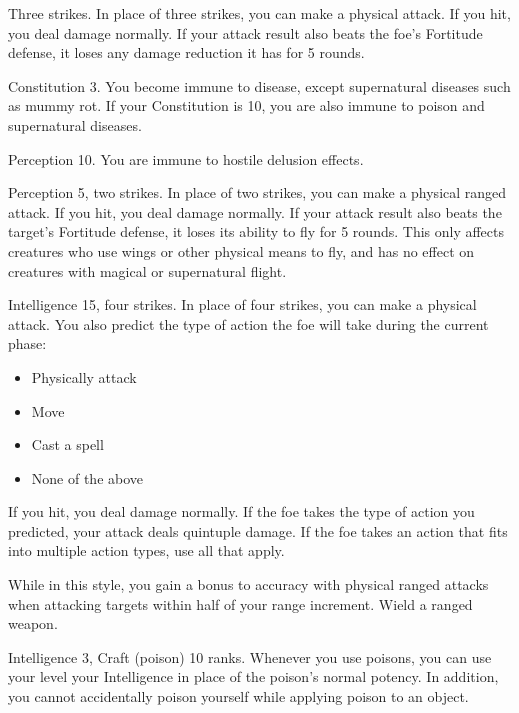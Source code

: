 \featpre Three strikes.
\featben In place of three strikes, you can make a physical attack.
If you hit, you deal damage normally.
If your attack result also beats the foe's Fortitude defense, it loses any damage reduction it has for 5 rounds.

\featpre Constitution 3.
\featben You become immune to disease, except supernatural diseases such as mummy rot.
If your Constitution is 10, you are also immune to poison and supernatural diseases.

\featpre Perception 10.
\featben You are immune to hostile delusion effects.

\featpre Perception 5, two strikes.
\featben In place of two strikes, you can make a physical ranged attack.
If you hit, you deal damage normally.
If your attack result also beats the target's Fortitude defense, it loses its ability to fly for 5 rounds.
This only affects creatures who use wings or other physical means to fly, and has no effect on creatures with magical or supernatural flight.

\featpre Intelligence 15, four strikes.
\featben In place of four strikes, you can make a physical attack.
You also predict the type of action the foe will take during the current phase:
\begin{itemize}
    \item Physically attack
    \item Move
    \item Cast a spell
    \item None of the above
\end{itemize}
If you hit, you deal damage normally.
If the foe takes the type of action you predicted, your attack deals quintuple damage.
If the foe takes an action that fits into multiple action types, use all that apply.

\featben While in this style, you gain a  bonus to accuracy with physical ranged attacks when attacking targets within half of your range increment.
\stylereq Wield a ranged weapon.

\featpres Intelligence 3, Craft (poison) 10 ranks.
\featben Whenever you use poisons, you can use your level \add your Intelligence in place of the poison's normal potency.
In addition, you cannot accidentally poison yourself while applying poison to an object.

